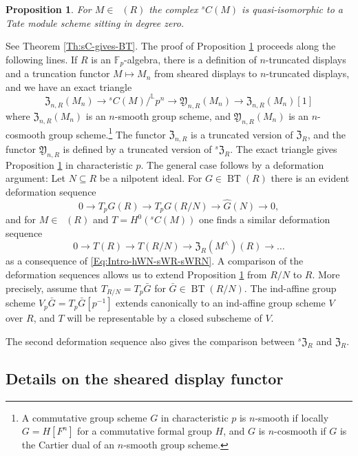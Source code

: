\documentclass[a4paper,11pt]{amsart}
\theoremstyle{plain}
\newtheorem{PrABC}[LeABC]{Proposition}
\theoremstyle{definition}
\theoremstyle{remark}
\newcommand{\uM}{M} %
\numberwithin{equation}{section}
\newcommand{\FY}{\mathfrak{Y}}
\newcommand{\FZ}{\mathfrak{Z}}
\newcommand{\FF}{{\mathbb{F}}}
\newcommand{\LL}{{\mathbb{L}}}
\DeclareMathOperator{\BT}{BT}
\DeclareMathOperator{\sDisp}{{}^sDisp}
\newcommand{\sC}{{}^{s}C}
\newcommand{\sFZ}{{}^s\FZ}
\begin{document}
\begin{PrABC}
\label{Pr:Intro-sFZ}
For $\uM\in\sDisp(R)$ the complex\/ $\sC(\uM)$ is quasi-isomorphic to a Tate module scheme sitting in degree zero.
\end{PrABC}

See Theorem \ref{Th:sC-gives-BT}.
The proof of Proposition \ref{Pr:Intro-sFZ} proceeds along the following lines.
If $R$ is an $\FF_p$-algebra, there is a definition of $n$-truncated displays and a truncation functor $\uM\mapsto\uM_n$ from sheared displays to $n$-truncated displays, and we have an exact triangle 
\[
\FZ_{n,R}(\uM_n)\to\sC(\uM)/^{\LL}p^n\to\FY_{n,R}(\uM_n)\to \FZ_{n,R}(\uM_n)[1]
\]
where $\FZ_{n,R}(\uM_n)$ is an $n$-smooth group scheme, and $\FY_{n,R}(\uM_n)$ is an $n$-cosmooth group scheme.\footnote{A commutative group scheme $G$ in characteristic $p$ is $n$-smooth if locally $G=H[F^n]$ for a commutative formal group $H$, and $G$ is $n$-cosmooth if $G$ is the Cartier dual of an $n$-smooth group scheme.} The functor $\FZ_{n,R}$ is a truncated version of $\FZ_R$, 
and the functor $\FY_{n,R}$ is defined by a truncated version of $\sFZ_R$. 
The exact triangle gives Proposition \ref{Pr:Intro-sFZ} in characteristic $p$.
The general case follows by a deformation argument:  
Let $N\subseteq R$ be a nilpotent ideal. 
For $G\in\BT(R)$ there is an evident deformation sequence
\[
0\to T_pG(R)\to T_pG(R/N)\to \hat G(N)\to 0,
\]
and for $\uM\in\sDisp(R)$ and $T=H^0(\sC(\uM))$ one finds a similar deformation sequence
\[
0\to T(R)\to T(R/N)\to\FZ_R(\uM^\wedge)(R)\to\ldots
\]
as a consequence of \eqref{Eq:Intro-hWN-sWR-sWRN}.
A comparison of the deformation sequences allows us to extend Proposition \ref{Pr:Intro-sFZ} from $R/N$ to $R$. More precisely, assume that $T_{R/N}=T_p\bar G$ for $\bar G\in\BT(R/N)$. The ind-affine group scheme $V_p\bar G=T_p\bar G[p^{-1}]$ extends canonically to an ind-affine group scheme $V$ over $R$, and $T$ will be representable by a closed subscheme of $V$. 

The second deformation sequence also gives the comparison between $\sFZ_R$ and $\FZ_R$.

\subsection{Details on the sheared display functor}
\end{document}

